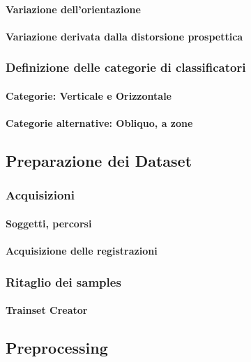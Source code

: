                 \paragraph{Variazione dell'orientazione}
                \paragraph{Variazione derivata dalla distorsione prospettica}
            \subsubsection{Definizione delle categorie di classificatori}
                \paragraph{Categorie: Verticale e Orizzontale}
                \paragraph{Categorie alternative: Obliquo, a zone}
        \subsection{Preparazione dei Dataset}
        \label{sub:datasets_setup}
            \subsubsection{Acquisizioni}
                \paragraph{Soggetti, percorsi}
                \paragraph{Acquisizione delle registrazioni}
            \subsubsection{Ritaglio dei samples}
                \paragraph{Trainset Creator}
        \subsection{Preprocessing}
        \label{sub:preprocessing}
